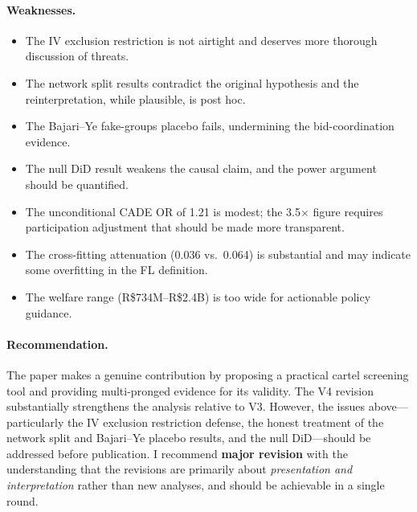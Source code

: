 \documentclass[12pt]{article}
\begin{document}
\paragraph{Weaknesses.}
\begin{itemize}[]
  \item The IV exclusion restriction is not airtight and deserves more
    thorough discussion of threats.
  \item The network split results contradict the original hypothesis
    and the reinterpretation, while plausible, is post hoc.
  \item The Bajari--Ye fake-groups placebo fails, undermining
    the bid-coordination evidence.
  \item The null DiD result weakens the causal claim, and the power
    argument should be quantified.
  \item The unconditional CADE OR of 1.21 is modest; the 3.5$\times$
    figure requires participation adjustment that should be made
    more transparent.
  \item The cross-fitting attenuation (0.036 vs.\ 0.064) is
    substantial and may indicate some overfitting in the FL definition.
  \item The welfare range (R\$734M--R\$2.4B) is too wide for actionable
    policy guidance.
\end{itemize}

\paragraph{Recommendation.}
The paper makes a genuine contribution by proposing a practical cartel
screening tool and providing multi-pronged evidence for its validity.
The V4 revision substantially strengthens the analysis relative to V3.
However, the issues above---particularly the IV exclusion restriction
defense, the honest treatment of the network split and Bajari--Ye
placebo results, and the null DiD---should be addressed before
publication. I recommend \textbf{major revision} with the understanding
that the revisions are primarily about \emph{presentation and
interpretation} rather than new analyses, and should be achievable in
a single round.
\end{document}
